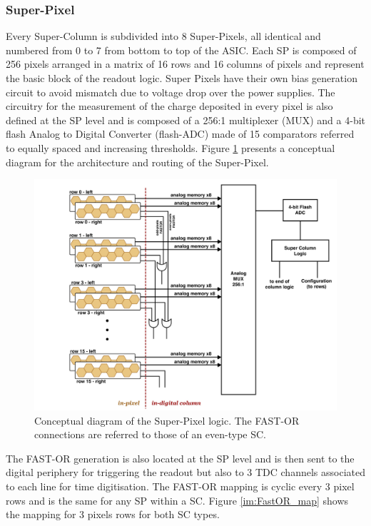 			\subsubsection{Super-Pixel} 
			Every Super-Column is subdivided into 8 Super-Pixels, all identical and numbered from 0 to 7 from bottom to top of the ASIC. Each SP is composed of 256 pixels arranged in a matrix of 16 rows and 16 columns of pixels and represent the basic block of the readout logic. Super Pixels have their own bias generation circuit to avoid mismatch due to voltage drop over the power supplies. The circuitry for the measurement of the charge deposited in every pixel is also defined at the SP level and is composed of a 256:1 multiplexer (MUX) and a 4-bit flash Analog to Digital Converter (flash-ADC) made of 15 comparators referred to equally spaced and increasing thresholds. Figure \ref{im:SuperPixel_logic} presents a conceptual diagram for the architecture and routing of the Super-Pixel. 
			\begin{figure}[h]
				\centering
				\includegraphics[width=1.0\textwidth]{files/SuperPixel_logic}
				\caption{Conceptual diagram of the Super-Pixel logic. The FAST-OR connections are referred to those of an even-type SC. }
				\label{im:SuperPixel_logic}
			\end{figure}
			
			 The FAST-OR generation is also located at the SP level and is then sent to the digital periphery for triggering the readout but also to 3 TDC channels associated to each line for time digitisation. The FAST-OR mapping is cyclic every 3 pixel rows and is the same for any SP within a SC. Figure \ref{im:FastOR_map} shows the mapping for 3 pixels rows for both SC types. 
			
